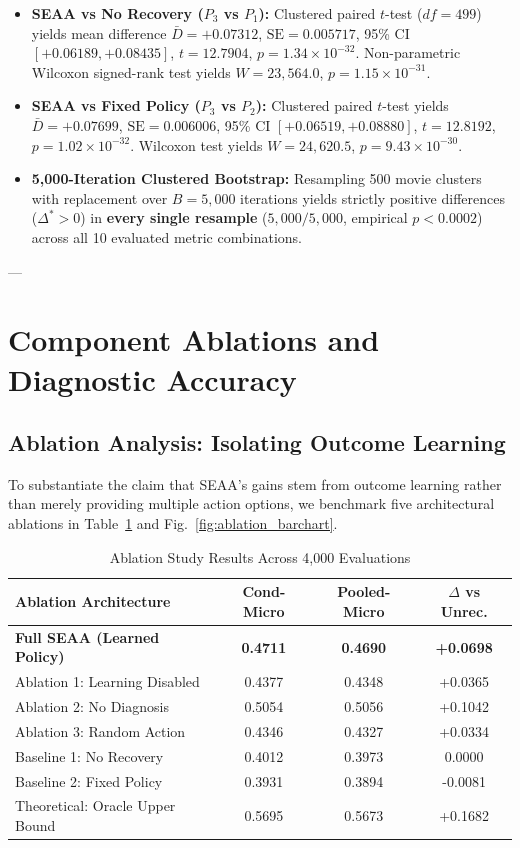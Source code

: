 \documentclass[journal]{IEEEtran}
\begin{document}
\begin{itemize}
    \item \textbf{SEAA vs No Recovery ($P_3$ vs $P_1$):} Clustered paired $t$-test ($df=499$) yields mean difference $\bar{D} = +0.07312$, $\text{SE} = 0.005717$, 95\% CI $[+0.06189, +0.08435]$, $t = 12.7904$, $p = 1.34 \times 10^{-32}$. Non-parametric Wilcoxon signed-rank test yields $W = 23,564.0$, $p = 1.15 \times 10^{-31}$.
    \item \textbf{SEAA vs Fixed Policy ($P_3$ vs $P_2$):} Clustered paired $t$-test yields $\bar{D} = +0.07699$, $\text{SE} = 0.006006$, 95\% CI $[+0.06519, +0.08880]$, $t = 12.8192$, $p = 1.02 \times 10^{-32}$. Wilcoxon test yields $W = 24,620.5$, $p = 9.43 \times 10^{-30}$.
    \item \textbf{5,000-Iteration Clustered Bootstrap:} Resampling 500 movie clusters with replacement over $B=5,000$ iterations yields strictly positive differences ($\Delta^* > 0$) in \textbf{every single resample} ($5,000 / 5,000$, empirical $p < 0.0002$) across all 10 evaluated metric combinations.
\end{itemize}

---

\section{Component Ablations and Diagnostic Accuracy}

\subsection{Ablation Analysis: Isolating Outcome Learning}
To substantiate the claim that SEAA's gains stem from outcome learning rather than merely providing multiple action options, we benchmark five architectural ablations in Table~\ref{tab:ablation_results} and Fig.~\ref{fig:ablation_barchart}.

\begin{table}[h]
\centering
\caption{Ablation Study Results Across 4,000 Evaluations}
\label{tab:ablation_results}
\begin{tabular}{lccc}
\toprule
\textbf{Ablation Architecture} & \textbf{Cond-Micro} & \textbf{Pooled-Micro} & \textbf{$\Delta$ vs Unrec.} \\
\midrule
\textbf{Full SEAA (Learned Policy)} & \textbf{0.4711} & \textbf{0.4690} & \textbf{+0.0698} \\
Ablation 1: Learning Disabled & 0.4377 & 0.4348 & +0.0365 \\
Ablation 2: No Diagnosis & 0.5054 & 0.5056 & +0.1042 \\
Ablation 3: Random Action & 0.4346 & 0.4327 & +0.0334 \\
Baseline 1: No Recovery & 0.4012 & 0.3973 & 0.0000 \\
Baseline 2: Fixed Policy & 0.3931 & 0.3894 & -0.0081 \\
Theoretical: Oracle Upper Bound & 0.5695 & 0.5673 & +0.1682 \\
\bottomrule
\end{tabular}
\end{table}
\end{document}
